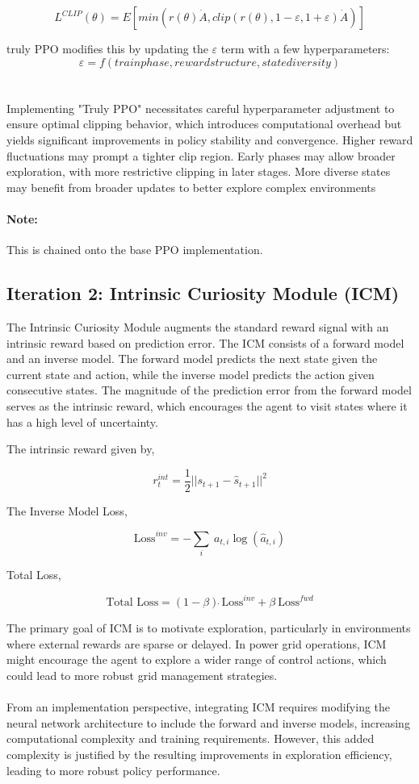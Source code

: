 \documentclass[
12pt, %
oneside, %
english, %
onehalfspacing, %
nolistspacing, %
liststotoc, %
headsepline, %
]{ProposalAndThesis} %
\begin{document}
\[L^{CLIP}(\theta) = E [min(r(\theta)\dot{A}, clip(r(\theta), 1-\varepsilon, 1+\varepsilon)\dot{A})]\]

truly PPO modifies this by updating the \(\varepsilon\) term with a few hyperparameters:
\[\varepsilon = f(train phase, reward structure, state diversity)\] 
\\\\
\noindent Implementing "Truly PPO" necessitates careful hyperparameter adjustment to ensure optimal clipping behavior, which introduces computational overhead but yields significant improvements in policy stability and convergence. Higher reward fluctuations may prompt a tighter clip region. Early phases may allow broader exploration, with more restrictive clipping in later stages. More diverse states may benefit from broader updates to better explore complex environments 
\paragraph{Note:} This is chained onto the base PPO implementation.


\subsection{Iteration 2: Intrinsic Curiosity Module (ICM)}

The Intrinsic Curiosity Module augments the standard reward signal with an intrinsic reward based on prediction error. The ICM consists of a forward model and an inverse model. The forward model predicts the next state given the current state and action, while the inverse model predicts the action given consecutive states. The magnitude of the prediction error from the forward model serves as the intrinsic reward, which encourages the agent to visit states where it has a high level of uncertainty.

The intrinsic reward given by,

\[r_{t}^{int} = \frac{1}{2}||s_{t+1} - \hat{s}_{t+1}||^2\]

The Inverse Model Loss,

\[\text{Loss}^{inv} = - \sum_{i} \ a_{t,i}\log(\hat{a}_{t,i})\]

Total Loss,

\[\text{Total Loss} = (1 - \beta) \dot \ \text{Loss}^{inv} + \beta \dot \ \text{Loss}^{fwd}\]


\noindent The primary goal of ICM is to motivate exploration, particularly in environments where external rewards are sparse or delayed. In power grid operations, ICM might encourage the agent to explore a wider range of control actions, which could lead to more robust grid management strategies.
\\\\
\noindent From an implementation perspective, integrating ICM requires modifying the neural network architecture to include the forward and inverse models, increasing computational complexity and training requirements. However, this added complexity is justified by the resulting improvements in exploration efficiency, leading to more robust policy performance.
\end{document}
